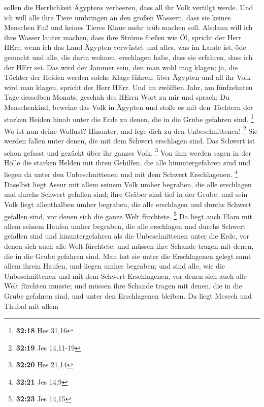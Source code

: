 sollen die Herrlichkeit Ägyptens verheeren, dass all ihr Volk vertilgt
werde.  Und ich will alle ihre Tiere umbringen an den
großen Wassern, dass sie keines Menschen Fuß und keines Tieres Klaue
mehr trüb machen soll.  Alsdann will ich ihre Wasser lauter
machen, dass ihre Ströme fließen wie Öl, spricht der Herr HErr,
 wenn ich das Land Ägypten verwüstet und alles, was im
Lande ist, öde gemacht und alle, die darin wohnen, erschlagen habe, dass
sie erfahren, dass ich der HErr sei.  Das wird der Jammer
sein, den man wohl mag klagen; ja, die Töchter der Heiden werden solche
Klage führen; über Ägypten und all ihr Volk wird man klagen, spricht der
Herr HErr.  Und im zwölften Jahr, am fünfzehnten Tage
desselben Monats, geschah des HErrn Wort zu mir und sprach:
 Du Menschenkind, beweine das Volk in Ägypten und stoße es
mit den Töchtern der starken Heiden hinab unter die Erde zu denen, die
in die Grube gefahren sind. \footnote{\textbf{32:18} Hes 31,16}
 Wo ist nun deine Wollust? Hinunter, und lege dich zu den
Unbeschnittenen! \footnote{\textbf{32:19} Jes 14,11-19} 
Sie werden fallen unter denen, die mit dem Schwert erschlagen sind. Das
Schwert ist schon gefasst und gezückt über ihr ganzes Volk. \footnote{\textbf{32:20}
  Hes 21,14}  Von ihm werden sagen in der Hölle die starken
Helden mit ihren Gehilfen, die alle hinuntergefahren sind und liegen da
unter den Unbeschnittenen und mit dem Schwert Erschlagenen. \footnote{\textbf{32:21}
  Jes 14,9}  Daselbst liegt Assur mit allem seinem Volk
umher begraben, die alle erschlagen und durchs Schwert gefallen sind;
 ihre Gräber sind tief in der Grube, und sein Volk liegt
allenthalben umher begraben, die alle erschlagen und durchs Schwert
gefallen sind, vor denen sich die ganze Welt fürchtete. \footnote{\textbf{32:23}
  Jes 14,15}  Da liegt auch Elam mit allem seinem Haufen
umher begraben, die alle erschlagen und durchs Schwert gefallen sind und
hinuntergefahren als die Unbeschnittenen unter die Erde, vor denen sich
auch alle Welt fürchtete; und müssen ihre Schande tragen mit denen, die
in die Grube gefahren sind.  Man hat sie unter die
Erschlagenen gelegt samt allem ihrem Haufen, und liegen umher begraben;
und sind alle, wie die Unbeschnittenen und mit dem Schwert Erschlagenen,
vor denen sich auch alle Welt fürchten musste; und müssen ihre Schande
tragen mit denen, die in die Grube gefahren sind, und unter den
Erschlagenen bleiben.  Da liegt Mesech und Thubal mit allem
